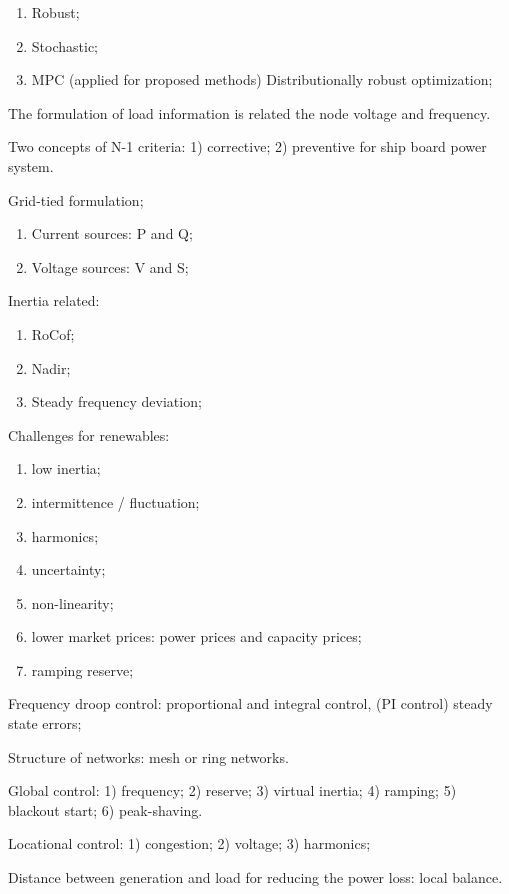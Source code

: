 \documentclass{article}
\begin{document}
\begin{enumerate}
  \item Robust; 
  \item Stochastic;
  \item MPC (applied for proposed methods) Distributionally robust optimization;
\end{enumerate}

The formulation of load information is related the node voltage and frequency.

Two concepts of N-1 criteria: 1) corrective; 2) preventive for ship board power system.

Grid-tied formulation;
\begin{enumerate}
  \item Current sources: P and Q; 
  \item Voltage sources: V and S;
\end{enumerate}

Inertia related:
\begin{enumerate}
  \item RoCof;
  \item Nadir;
  \item Steady frequency deviation;
\end{enumerate}

Challenges for renewables: 

\begin{enumerate}
  \item low inertia;
  \item intermittence / fluctuation;
  \item harmonics;
  \item uncertainty;
  \item non-linearity;
  \item lower market prices: power prices and capacity prices;
  \item ramping reserve;
\end{enumerate}

Frequency droop control: proportional and integral control, (PI control) steady state errors; 

Structure of networks: mesh or ring networks.


Global control: 1) frequency; 2) reserve; 3) virtual inertia; 4) ramping; 5) blackout start; 6) peak-shaving.

Locational control: 1) congestion; 2) voltage; 3) harmonics; 

Distance between generation and load for reducing the power loss: local balance.
\end{document}
